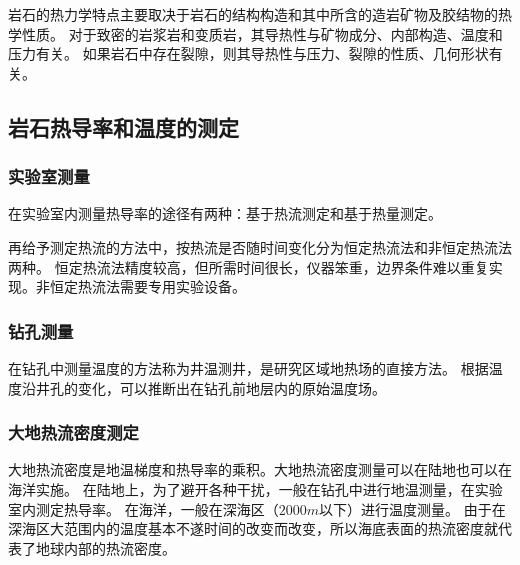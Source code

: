 \documentclass[hyperref,UTF-8,twoside]{ctexart}
\begin{document}
岩石的热力学特点主要取决于岩石的结构构造和其中所含的造岩矿物及胶结物的热学性质。
对于致密的岩浆岩和变质岩，其导热性与矿物成分、内部构造、温度和压力有关。
如果岩石中存在裂隙，则其导热性与压力、裂隙的性质、几何形状有关。
\subsection{岩石热导率和温度的测定}
\subsubsection{实验室测量}
在实验室内测量热导率的途径有两种：基于热流测定和基于热量测定。

再给予测定热流的方法中，按热流是否随时间变化分为恒定热流法和非恒定热流法两种。
恒定热流法精度较高，但所需时间很长，仪器笨重，边界条件难以重复实现。非恒定热流法需要专用实验设备。
\subsubsection{钻孔测量}
在钻孔中测量温度的方法称为井温测井，是研究区域地热场的直接方法。
根据温度沿井孔的变化，可以推断出在钻孔前地层内的原始温度场。
\subsubsection{大地热流密度测定}
大地热流密度是地温梯度和热导率的乘积。大地热流密度测量可以在陆地也可以在海洋实施。
在陆地上，为了避开各种干扰，一般在钻孔中进行地温测量，在实验室内测定热导率。
在海洋，一般在深海区（$2000m$以下）进行温度测量。
由于在深海区大范围内的温度基本不遂时间的改变而改变，所以海底表面的热流密度就代表了地球内部的热流密度。
\nocite{shiye}
\nocite{quanjing}

\end{document}

